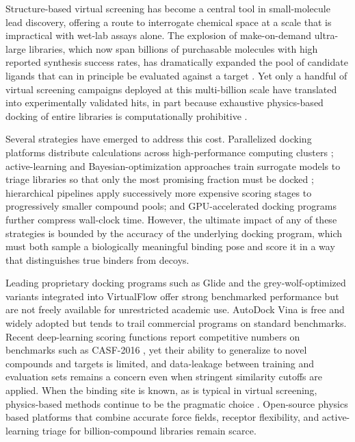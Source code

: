 \documentclass[10pt]{article}
\begin{document}
Structure-based virtual screening has become a central tool in small-molecule
lead discovery, offering a route to interrogate chemical space at a scale that
is impractical with wet-lab assays alone. The explosion of make-on-demand
ultra-large libraries, which now span billions of purchasable molecules with
high reported synthesis success rates, has dramatically expanded the pool of
candidate ligands that can in principle be evaluated against a target
\citep{lyu2019ultralarge,tingle2023zinc22,irwin2005zinc}. Yet only a handful of
virtual screening campaigns deployed at this multi-billion scale have
translated into experimentally validated hits, in part because exhaustive
physics-based docking of entire libraries is computationally prohibitive
\citep{gorgulla2020virtualflow,gentile2022deepdocking}.

Several strategies have emerged to address this cost. Parallelized docking
platforms distribute calculations across high-performance computing clusters
\citep{gorgulla2020virtualflow,yaacoub2022ddgui}; active-learning and
Bayesian-optimization approaches train surrogate models to triage libraries so
that only the most promising fraction must be docked
\citep{graff2021accelerating,gentile2022deepdocking}; hierarchical pipelines
apply successively more expensive scoring stages to progressively smaller
compound pools; and GPU-accelerated docking programs further compress
wall-clock time. However, the ultimate impact of any of these strategies is
bounded by the accuracy of the underlying docking program, which must both
sample a biologically meaningful binding pose and score it in a way that
distinguishes true binders from decoys.

Leading proprietary docking programs such as Glide \citep{friesner2004glide}
and the grey-wolf-optimized variants integrated into VirtualFlow
\citep{gorgulla2020virtualflowgwo} offer strong benchmarked performance but
are not freely available for unrestricted academic use. AutoDock Vina
\citep{trott2010vina} is free and widely adopted but tends to trail
commercial programs on standard benchmarks. Recent deep-learning scoring
functions report competitive numbers on benchmarks such as CASF-2016
\citep{su2019casf2016,liu2017pdbbind,scantlebury2023pointvs}, yet their ability
to generalize to novel compounds and targets is limited, and data-leakage
between training and evaluation sets remains a concern even when stringent
similarity cutoffs are applied. When the binding site is known, as is typical
in virtual screening, physics-based methods continue to be the pragmatic
choice \citep{chaput2017usc,ebejer2019ligity,li2024cache}. Open-source physics
based platforms that combine accurate force fields, receptor flexibility, and
active-learning triage for billion-compound libraries remain scarce.
\end{document}
